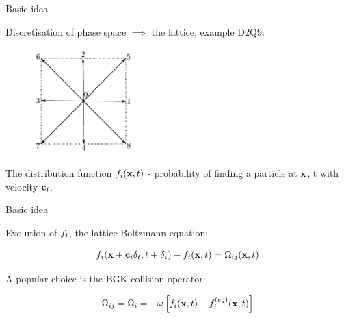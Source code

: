 \begin{frame}{Basic idea}

\begin{itemize*}

\item Discretisation of phase space $\implies$ the lattice, example D2Q9:
\begin{figure}
  \centering
\includegraphics[width=0.35\textwidth]{../fig/lattice_d2q9.pdf}
\end{figure}

\item The distribution function $f_i(\mathbf{x}, t)$ - probability of finding
  a particle at $\mathbf{x}$, t with velocity $\mathbf{c}_i$.
\end{itemize*}


\end{frame}

\begin{frame}{Basic idea}

\begin{itemize*}
\item Evolution of $f_i$, the lattice-Boltzmann equation:

\begin{equation}\label{eq:lbm:lbe}
f_i(\x + \cbf_i\delta_t, t + \delta_t) - f_i(\x, t) = \Omega_{ij}(\x, t)
\end{equation}

\item A popular choice is the BGK collision operator:

\begin{equation}\label{eq:lbm:bgk}
\Omega_{ij} = \Omega_i = -\omega \left[ f_i(\x, t) - f_i^{(eq)}(\x, t)
  \right]
\end{equation}

\end{itemize*}

\end{frame}

